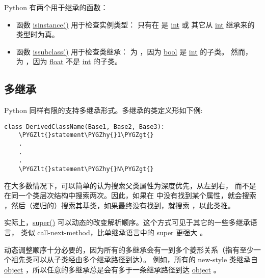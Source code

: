 \documentclass[a4paper,10pt,english]{sphinxmanual}
\def\PYGZlt{\char`\<}
\def\PYGZgt{\char`\>}
\def\PYGZhy{\char`\-}
\begin{document}
Python 有两个用于继承的函数：
\begin{itemize}
\item {} 
函数 \href{https://docs.python.org/3/library/functions.html\#isinstance}{isinstance()} 用于检查实例类型：  只有在  是 \href{https://docs.python.org/3/library/functions.html\#int}{int} 或
其它从 \href{https://docs.python.org/3/library/functions.html\#int}{int} 继承来的类型时为真。

\item {} 
函数 \href{https://docs.python.org/3/library/functions.html\#issubclass}{issubclass()} 用于检查类继承：  为 ，因为 \href{https://docs.python.org/3/library/functions.html\#bool}{bool} 是 \href{https://docs.python.org/3/library/functions.html\#int}{int} 的子类。
然而，  为 ，因为 \href{https://docs.python.org/3/library/functions.html\#float}{float} 不是 \href{https://docs.python.org/3/library/functions.html\#int}{int} 的子类。

\end{itemize}


\subsection{多继承}
\label{classes:tut-multiple}\label{classes:id13}
Python 同样有限的支持多继承形式。多继承的类定义形如下例:

\begin{Verbatim}[commandchars=\\\{\}]
class DerivedClassName(Base1, Base2, Base3):
    \PYGZlt{}statement\PYGZhy{}1\PYGZgt{}
    .
    .
    .
    \PYGZlt{}statement\PYGZhy{}N\PYGZgt{}
\end{Verbatim}

在大多数情况下，可以简单的认为搜索父类属性为深度优先，从左到右，
而不是在同一个类层次结构中搜索两次。因此，如果在 
中没有找到某个属性，就会搜索 ，然后（递归的）搜索其基类，如果最终没有找到，就搜索 ，以此类推。

实际上，\href{https://docs.python.org/3/library/functions.html\#super}{super()} 可以动态的改变解析顺序。这个方式可见于其它的一些多继承语言，
类似 call-next-method，比单继承语言中的 super 更强大 。

动态调整顺序十分必要的，因为所有的多继承会有一到多个菱形关系（指有至少一个祖先类可以从子类经由多个继承路径到达）。
例如，所有的 new-style 类继承自 \href{https://docs.python.org/3/library/functions.html\#object}{object} ，所以任意的多继承总是会有多于一条继承路径到达 \href{https://docs.python.org/3/library/functions.html\#object}{object} 。
\end{document}
